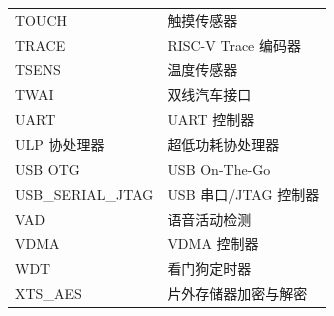\begin{longtable}[c]{p{3cm}p{12cm} }
TOUCH & 触摸传感器 \\
TRACE & RISC-V Trace 编码器 \\
TSENS & 温度传感器 \\
TWAI & 双线汽车接口 \\
UART & UART 控制器 \\
ULP 协处理器 & 超低功耗协处理器\\
USB OTG & USB On-The-Go \\
USB\_SERIAL\_JTAG & USB 串口/JTAG 控制器 \\
VAD & 语音活动检测 \\
VDMA & VDMA 控制器 \\
WDT & 看门狗定时器 \\
XTS\_AES & 片外存储器加密与解密 \\

\end{longtable}




